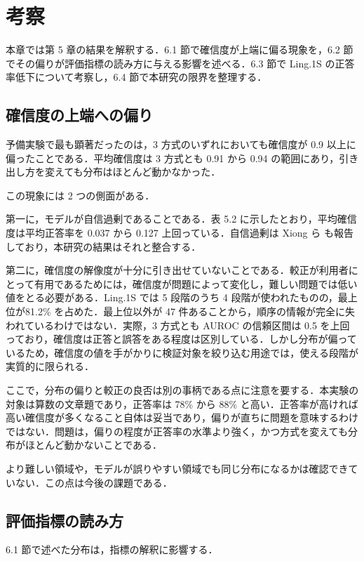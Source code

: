 \section{考察}

本章では第 5 章の結果を解釈する．6.1 節で確信度が上端に偏る現象を，6.2 節でその偏りが評価指標の読み方に与える影響を述べる．6.3 節で Ling.1S の正答率低下について考察し，6.4 節で本研究の限界を整理する．

\subsection{確信度の上端への偏り}

予備実験で最も顕著だったのは，3 方式のいずれにおいても確信度が 0.9 以上に偏ったことである．平均確信度は 3 方式とも 0.91 から 0.94 の範囲にあり，引き出し方を変えても分布はほとんど動かなかった．

この現象には 2 つの側面がある．

第一に，モデルが自信過剰であることである．表 5.2 に示したとおり，平均確信度は平均正答率を 0.037 から 0.127 上回っている．自信過剰は Xiong ら \cite{xiong2024llmuncertainty} も報告しており，本研究の結果はそれと整合する．

第二に，確信度の解像度が十分に引き出せていないことである．較正が利用者にとって有用であるためには，確信度が問題によって変化し，難しい問題では低い値をとる必要がある．Ling.1S では 5 段階のうち 4 段階が使われたものの，最上位が81.2\% を占めた．最上位以外が 47 件あることから，順序の情報が完全に失われているわけではない．実際，3 方式とも AUROC の信頼区間は 0.5 を上回っており，確信度は正答と誤答をある程度は区別している．しかし分布が偏っているため，確信度の値を手がかりに検証対象を絞り込む用途では，使える段階が実質的に限られる．

ここで，分布の偏りと較正の良否は別の事柄である点に注意を要する．本実験の対象は算数の文章題であり，正答率は 78\% から 88\% と高い．正答率が高ければ高い確信度が多くなること自体は妥当であり，偏りが直ちに問題を意味するわけではない．問題は，偏りの程度が正答率の水準より強く，かつ方式を変えても分布がほとんど動かないことである．

より難しい領域や，モデルが誤りやすい領域でも同じ分布になるかは確認できていない．この点は今後の課題である．

\subsection{評価指標の読み方}

6.1 節で述べた分布は，指標の解釈に影響する．

